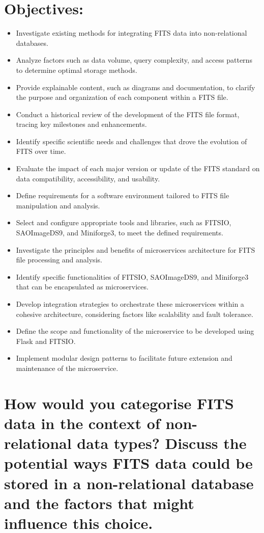 \documentclass[a4paper,oneside,11pt]{book}
\begin{document}
\section{Objectives:}
\begin{itemize}
    \item Investigate existing methods for integrating FITS data into non-relational databases.
    \item Analyze factors such as data volume, query complexity, and access patterns to determine optimal storage methods.
    \item Provide explainable content, such as diagrams and documentation, to clarify the purpose and organization of each component within a FITS file.
    \item Conduct a historical review of the development of the FITS file format, tracing key milestones and enhancements.
    \item Identify specific scientific needs and challenges that drove the evolution of FITS over time.
    \item Evaluate the impact of each major version or update of the FITS standard on data compatibility, accessibility, and usability.
    \item Define requirements for a software environment tailored to FITS file manipulation and analysis.
    \item Select and configure appropriate tools and libraries, such as FITSIO, SAOImageDS9, and Miniforge3, to meet the defined requirements.
    \item Investigate the principles and benefits of microservices architecture for FITS file processing and analysis.
    \item Identify specific functionalities of FITSIO, SAOImageDS9, and Miniforge3 that can be encapsulated as microservices.
    \item Develop integration strategies to orchestrate these microservices within a cohesive architecture, considering factors like scalability and fault tolerance.
    \item Define the scope and functionality of the microservice to be developed using Flask and FITSIO.
    \item Implement modular design patterns to facilitate future extension and maintenance of the microservice.
\end{itemize}
\section{How would you categorise FITS data in the context of non-relational data types? Discuss the potential ways FITS data could be stored in a non-relational database and the factors that might influence this choice.}
\end{document}
